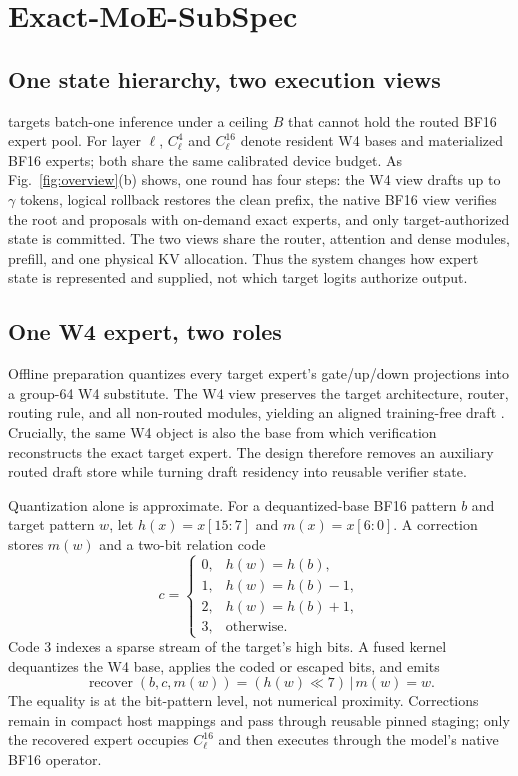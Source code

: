 \section{Exact-MoE-SubSpec}
\label{sec:method}

\subsection{One state hierarchy, two execution views}

\system targets batch-one inference under a ceiling $B$ that cannot hold the routed
BF16 expert pool. For layer $\ell$, $C^4_{\ell}$ and $C^{16}_{\ell}$ denote resident
W4 bases and materialized BF16 experts; both share the same calibrated device budget.
As Fig.~\ref{fig:overview}(b) shows, one round has four steps: the W4 view drafts up
to $\gamma$ tokens, logical rollback restores the clean prefix, the native BF16 view
verifies the root and proposals with on-demand exact experts, and only
target-authorized state is committed. The two views share the router, attention and
dense modules, prefill, and one physical KV allocation. Thus the system changes how
expert state is represented and supplied, not which target logits authorize output.

\subsection{One W4 expert, two roles}

Offline preparation quantizes every target expert's gate/up/down projections into a
group-64 W4 substitute. The W4 view preserves the target architecture, router,
routing rule, and all non-routed modules, yielding an aligned training-free draft
\cite{wang2025subspec}. Crucially, the same W4 object is also the base from which
verification reconstructs the exact target expert. The design therefore removes an
auxiliary routed draft store while turning draft residency into reusable verifier
state.

Quantization alone is approximate. For a dequantized-base BF16 pattern $b$ and target
pattern $w$, let $h(x)=x[15{:}7]$ and $m(x)=x[6{:}0]$. A correction stores $m(w)$ and
a two-bit relation code
\begin{equation}
c=\begin{cases}
0,&h(w)=h(b),\\
1,&h(w)=h(b)-1,\\
2,&h(w)=h(b)+1,\\
3,&\text{otherwise.}
\end{cases}
\label{eq:correction}
\end{equation}
Code 3 indexes a sparse stream of the target's high bits. A fused kernel dequantizes
the W4 base, applies the coded or escaped bits, and emits
\begin{equation}
\operatorname{recover}(b,c,m(w))=(h(w)\ll 7)\,|\,m(w)=w.
\label{eq:recovery}
\end{equation}
The equality is at the bit-pattern level, not numerical proximity. Corrections remain
in compact host mappings and pass through reusable pinned staging; only the recovered
expert occupies $C^{16}_{\ell}$ and then executes through the model's native BF16
operator.

